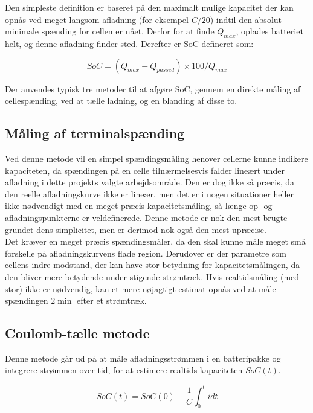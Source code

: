 Den simpleste definition er baseret på den maximalt mulige kapacitet der kan opnås ved meget langsom afladning (for eksempel $C/20$) indtil den absolut minimale spænding for cellen er nået. Derfor for at finde $Q_{max}$, oplades batteriet helt, og denne afladning finder sted. Derefter er SoC defineret som: 

\begin {equation} 
SoC = (Q_{max}-Q_{passed})\times 100/Q_{max} \label{eq:soc}
\end {equation}

Der anvendes typisk tre metoder til at afgøre SoC, gennem en direkte måling af cellespænding, ved at tælle ladning, og en blanding af disse to.

\subsection{Måling af terminalspænding}
Ved denne metode vil en simpel spændingsmåling henover cellerne kunne indikere kapaciteten, da spændingen på en celle tilnærmelsesvis falder lineært under afladning i dette projekts valgte arbejdsområde. Den er dog ikke så præcis, da den reelle afladningskurve ikke er lineær, men det er i nogen situationer heller ikke nødvendigt med en meget præcis kapacitetsmåling, så længe op- og afladningspunkterne er veldefinerede. Denne metode er nok den mest brugte grundet dens simplicitet, men er derimod nok også den mest upræcise. 
\\

Det kræver en meget præcis spændingsmåler, da den skal kunne måle meget små forskelle på afladningskurvens flade region. Derudover er der parametre som cellens indre modstand, der kan have stor betydning for kapacitetsmålingen, da den bliver mere betydende under stigende strømtræk. Hvis realtidsmåling (med stor) ikke er nødvendig, kan et mere nøjagtigt estimat opnås ved at måle spændingen $2\min$ efter et strømtræk.



\subsection{Coulomb-tælle metode}
Denne metode går ud på at måle afladningsstrømmen i en batteripakke og integrere strømmen over tid, for at estimere realtids-kapaciteten $SoC(t)$. 

\begin {equation} 
SoC(t) = SoC(0) - \frac{1}{C} \int_{0}^{t} idt  \label{eq:coulomb-count}
\end {equation}

